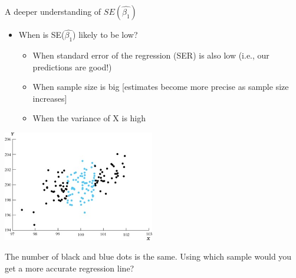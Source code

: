 \documentclass[
  8pt,
  ignorenonframetext,
  dvipsnames]{beamer}
\providecommand{\tightlist}{%
  \setlength{\itemsep}{0pt}\setlength{\parskip}{0pt}}
\let\olditem\item
\renewcommand{\item}{%
  \olditem\vspace{4pt}
}
\begin{document}
\begin{frame}{A deeper understanding of \(SE(\hat{\beta_1})\)}
\protect\hypertarget{a-deeper-understanding-of-sehatbeta_1-1}{}

\begin{itemize}
\tightlist
\item
  When is SE(\(\hat{\beta_1}\)) likely to be low?

  \begin{itemize}
  \tightlist
  \item
    When standard error of the regression (SER) is also low (i.e., our
    predictions are good!)
  \item
    When sample size is big {[}estimates become more precise as sample
    size increases{]}
  \item
    When the variance of X is high
  \end{itemize}
\end{itemize}

\includegraphics[width=2.60417in,height=\textheight]{varianceX.jpg}

The number of black and blue dots is the same. Using which sample would
you get a more accurate regression line?

\end{frame}
\end{document}
